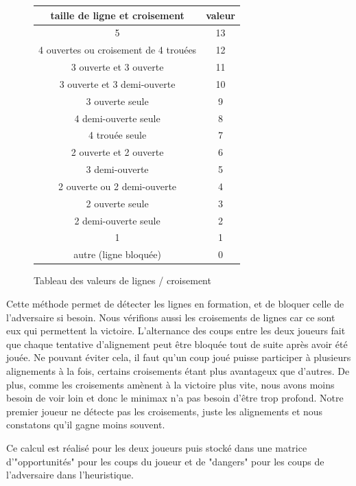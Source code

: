 \documentclass[a4paper,11pt]{article}
\begin{document}
\begin{figure} [h]
\caption{\label{lignes} Tableau des valeurs de lignes / croisement}
\centering
\begin{tabular}{|c|c|}
    \hline
    taille de ligne et croisement & valeur  \\
    \hline
    5 & 13 \\
    4 ouvertes ou croisement de 4 trouées & 12 \\
    3 ouverte et 3 ouverte & 11 \\
    3 ouverte et 3 demi-ouverte & 10 \\
    3 ouverte seule & 9 \\
    4 demi-ouverte seule & 8 \\
    4 trouée seule & 7 \\
    2 ouverte et 2 ouverte & 6 \\
    3 demi-ouverte & 5 \\
    2 ouverte ou 2 demi-ouverte & 4 \\
    2 ouverte seule & 3 \\
    2 demi-ouverte seule & 2 \\
    1 & 1 \\
    autre (ligne bloquée) & 0 \\
    \hline
\end{tabular}
\end{figure}

Cette méthode permet de détecter les lignes en formation, et de bloquer celle de l'adversaire si besoin. Nous vérifions aussi les croisements de lignes car ce sont eux qui permettent la victoire.
L'alternance des coups entre les deux joueurs fait que chaque tentative d'alignement peut être bloquée tout de suite après avoir été jouée. Ne pouvant éviter cela, il faut qu'un coup joué puisse participer à plusieurs alignements à la fois, certains croisements étant plus avantageux que d'autres.
De plus, comme les croisements amènent à la victoire plus vite, nous avons moins besoin de voir loin et donc le minimax n'a pas besoin d'être trop profond.
Notre premier joueur ne détecte pas les croisements, juste les alignements et nous constatons qu'il gagne moins souvent.

Ce calcul est réalisé pour les deux joueurs puis stocké dans une matrice d'"opportunités" pour les coups du joueur et de "dangers" pour les coups de l'adversaire dans l'heuristique.
\end{document}
